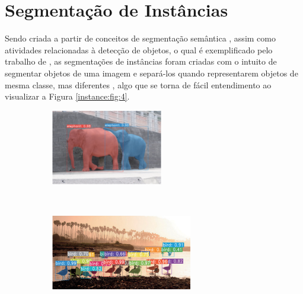 \newpage
\clearpage
\section{Segmentação de Instâncias}
\label{instance:instance}

Sendo criada a partir de conceitos de segmentação semântica \cite{Minaee2021}, assim como atividades relacionadas à detecção de objetos, o qual é exemplificado pelo trabalho de \cite{Vaillant1994}, as segmentações de instâncias foram criadas com o intuito de segmentar objetos de uma imagem e separá-los quando representarem objetos de mesma classe, mas diferentes \cite{Hafiz2020}, algo que se torna de fácil entendimento ao visualizar a Figura \ref{instance:fig:4}.

\begin{figure}[H]
   \caption{Exemplos de segmentação de instâncias.}
   \centering
   \label{instance:fig:4}
    \begin{subfigure}[t]{0.45\textwidth}
        \centering
        \includegraphics[height=1.3in]{recursos/imagens/instance/ins1.png}
        \label{instance:fig:4.1}
    \end{subfigure}%
    ~ 
    \begin{subfigure}[t]{0.45\textwidth}
        \centering
        \includegraphics[height=1.3in]{recursos/imagens/instance/ins3.png}
        \label{instance:fig:4.2}
    \end{subfigure}%
    ~ 
    

\end{figure}
